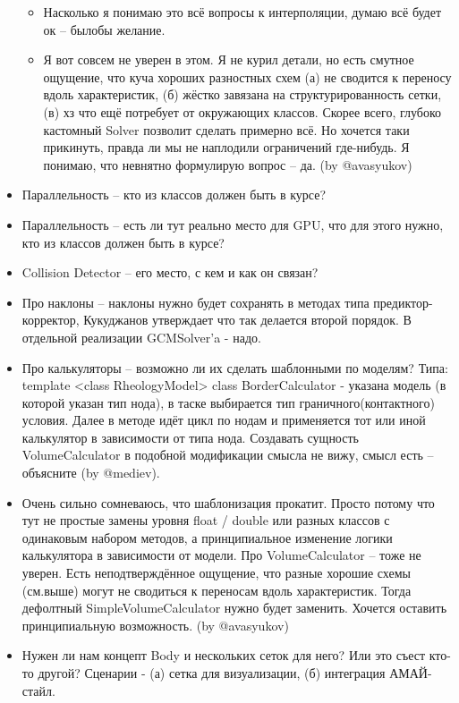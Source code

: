 \documentclass[a4paper,12pt]{article}
\numberwithin{equation}{section}
\begin{document}
\begin{itemize}
		\begin{itemize}
			\item{Насколько я понимаю это всё вопросы к интерполяции, думаю всё будет ок -- былобы желание.}
			\item{Я вот совсем не уверен в этом. Я не курил детали, но есть смутное ощущение, что куча хороших разностных схем (а) не сводится к переносу вдоль характеристик, (б) жёстко завязана на структурированность сетки, (в) хз что ещё потребует от окружающих классов. Скорее всего, глубоко кастомный Solver позволит сделать примерно всё. Но хочется таки прикинуть, правда ли мы не наплодили ограничений где-нибудь. Я понимаю, что невнятно формулирую вопрос -- да. (by @avasyukov)}
		\end{itemize}
		\item{Параллельность -- кто из классов должен быть в курсе?}
		\item{Параллельность -- есть ли тут реально место для GPU, что для этого нужно, кто из классов должен быть в курсе?}
		\item{Collision Detector -- его место, с кем и как он связан?}
		\item{Про наклоны -- наклоны нужно будет сохранять в методах типа предиктор-корректор, Кукуджанов утверждает что так делается второй порядок. В отдельной реализации GCMSolver'a - надо.}
		\item{Про калькуляторы -- возможно ли их сделать шаблонными по моделям? Типа: template <class RheologyModel> class BorderCalculator - указана модель (в которой указан тип нода), в таске выбирается тип граничного(контактного) условия. Далее в методе идёт цикл по нодам и применяется тот или иной калькулятор в зависимости от типа нода. Создавать сущность VolumeCalculator в подобной модификации смысла не вижу, смысл есть -- объясните (by @mediev).}
		\item{Очень сильно сомневаюсь, что шаблонизация прокатит. Просто потому что тут не простые замены уровня float / double или разных классов с одинаковым набором методов, а принципиальное изменение логики калькулятора в зависимости от модели. Про VolumeCalculator -- тоже не уверен. Есть неподтверждённое ощущение, что разные хорошие схемы (см.выше) могут не сводиться к переносам вдоль характеристик. Тогда дефолтный SimpleVolumeCalculator нужно будет заменить. Хочется оставить принципиальную возможность. (by @avasyukov)}
		\item{Нужен ли нам концепт Body и нескольких сеток для него? Или это съест кто-то другой? Сценарии - (а) сетка для визуализации, (б) интеграция АМАЙ-стайл.}
	\end{itemize}

\listoftodos
\end{document}
